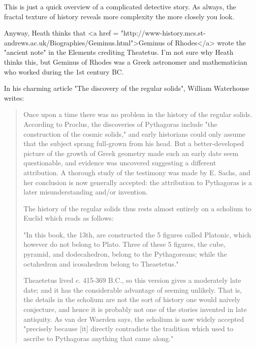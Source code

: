 This is just a quick overview of a complicated detective story. 
As always, the fractal texture of history reveals more complexity 
the more closely you look.

Anyway, Heath thinks that <a href =
"http://www-history.mcs.st-andrews.ac.uk/Biographies/Geminus.html">Geminus
of Rhodes</a> wrote the "ancient note" in the Elements
crediting Theatetus.  I'm not sure why Heath thinks this, but Geminus
of Rhodes was a Greek astronomer and mathematician who worked during
the 1st century BC.

In his charming article "The discovery of the regular
solids", William Waterhouse writes:

\begin{quote}
   Once upon a time there was no problem in the history of the regular
   solids.  According to Proclus, the discoveries of Pythagoras 
   include "the construction of the cosmic solids," and early 
   historians could only assume that the subject sprang full-grown 
   from his head.  But a better-developed picture of the growth
   of Greek geometry made such an early date seem questionable, and 
   evidence was uncovered suggesting a different attribution.  A 
   thorough study of the testimony was made by E. Sachs, and her 
   conclusion is now generally accepted: the attribution to Pythagoras 
   is a later misunderstanding and/or invention.

   The history of the regular solids thus rests almost entirely on a 
   scholium to Euclid which reads as follows: 

   "In this book, the 13th, are constructed the 5 figures called 
   Platonic, which however do not belong to Plato.  Three of these 
   5 figures, the cube, pyramid, and dodecahedron, belong to the 
   Pythagoreans; while the octahedron and icosahedron belong to 
   Theaetetus."

   Theaetetus lived c. 415-369 B.C., so this version gives a 
   moderately late date; and it has the considerable advantage of 
   seeming unlikely.  That is, the details in the scholium are not 
   the sort of history one would naively conjecture, and hence it 
   is probably not one of the stories invented in late antiquity.  
   As van der Waerden says, the scholium is now widely accepted 
   "precisely because [it] directly contradicts the tradition which 
   used to ascribe to Pythagoras anything that came along."  


\end{quote}
